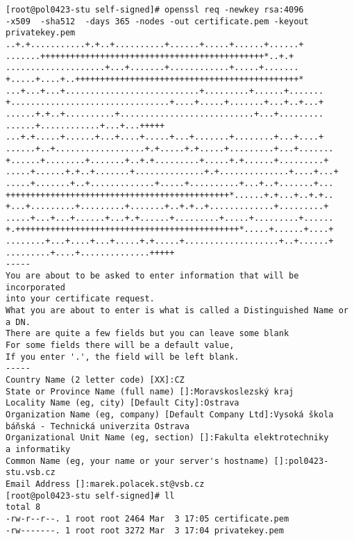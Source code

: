 \begin{verbatim}
[root@pol0423-stu self-signed]# openssl req -newkey rsa:4096
-x509  -sha512  -days 365 -nodes -out certificate.pem -keyout
privatekey.pem
..+.+...........+.+..+..........+......+.....+......+......+
.......+++++++++++++++++++++++++++++++++++++++++++++*..+.+
....................+...+.......+............+.....+.......
+.....+....+..+++++++++++++++++++++++++++++++++++++++++++++*
...+...+...+...........................+.........+......+.......
+................................+....+.....+.......+...+..+...+
......+.+..+..........+...........................+...+.........
......+............+...+...+++++
...+.+.....+......+...+....+.....+...+.......+........+...+....+
......+..+..................+.+.....+.+.....+.........+...+.......
+......+........+.......+..+.+.........+.....+.+......+.........+
.....+......+.+..+.......+..............+.+..............+....+...+
.....+.......+..+.............+.....+..........+...+..+.......+...
+++++++++++++++++++++++++++++++++++++++++++++*......+.+...+..+.+..
+...+.........+.........+.......+..+.+..+.............+.........+
.....+...+...+......+...+.+......+.........+.....+.........+......
+.+++++++++++++++++++++++++++++++++++++++++++++*.....+......+....+
........+...+....+...+.....+.+.....+...................+..+......+
.........+....+..............+++++
-----
You are about to be asked to enter information that will be incorporated
into your certificate request.
What you are about to enter is what is called a Distinguished Name or a DN.
There are quite a few fields but you can leave some blank
For some fields there will be a default value,
If you enter '.', the field will be left blank.
-----
Country Name (2 letter code) [XX]:CZ
State or Province Name (full name) []:Moravskoslezský kraj
Locality Name (eg, city) [Default City]:Ostrava
Organization Name (eg, company) [Default Company Ltd]:Vysoká škola
báňská - Technická univerzita Ostrava
Organizational Unit Name (eg, section) []:Fakulta elektrotechniky
a informatiky
Common Name (eg, your name or your server's hostname) []:pol0423-stu.vsb.cz
Email Address []:marek.polacek.st@vsb.cz
[root@pol0423-stu self-signed]# ll
total 8
-rw-r--r--. 1 root root 2464 Mar  3 17:05 certificate.pem
-rw-------. 1 root root 3272 Mar  3 17:04 privatekey.pem
\end{verbatim}

